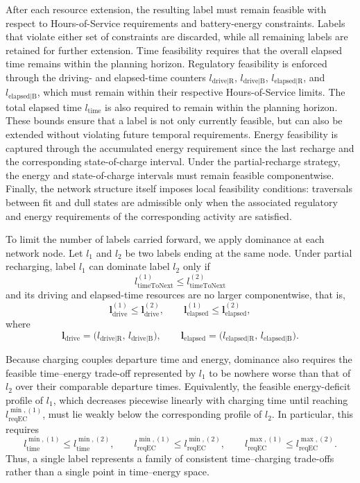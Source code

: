 \documentclass[3p,11pt,authoryear]{elsarticle}  %
\begin{document}

After each resource extension, the resulting label must remain feasible with respect to Hours-of-Service requirements and battery-energy constraints. Labels that violate either set of constraints are discarded, while all remaining labels are retained for further extension. Time feasibility requires that the overall elapsed time remains within the planning horizon. Regulatory feasibility is enforced through the driving- and elapsed-time counters \(l_{\text{drive|R}}\), \(l_{\text{drive|B}}\), \(l_{\text{elapsed|R}}\), and \(l_{\text{elapsed|B}}\), which must remain within their respective Hours-of-Service limits. The total elapsed time \(l_{\text{time}}\) is also required to remain within the planning horizon. These bounds ensure that a label is not only currently feasible, but can also be extended without violating future temporal requirements. Energy feasibility is captured through the accumulated energy requirement since the last recharge and the corresponding state-of-charge interval. Under the partial-recharge strategy, the energy and state-of-charge intervals must remain feasible componentwise. Finally, the network structure itself imposes local feasibility conditions: traversals between fit and dull states are admissible only when the associated regulatory and energy requirements of the corresponding activity are satisfied.

To limit the number of labels carried forward, we apply dominance at each network node. Let \(l_1\) and \(l_2\) be two labels ending at the same node. Under partial recharging, label \(l_1\) can dominate label \(l_2\) only if
\[
l_{\text{timeToNext}}^{(1)} \le l_{\text{timeToNext}}^{(2)}
\]
and its driving and elapsed-time resources are no larger componentwise, that is,
\[
\mathbf{l}_{\text{drive}}^{(1)} \le \mathbf{l}_{\text{drive}}^{(2)}, 
\qquad
\mathbf{l}_{\text{elapsed}}^{(1)} \le \mathbf{l}_{\text{elapsed}}^{(2)},
\]
where
\[
\mathbf{l}_{\text{drive}}
=
\bigl(l_{\text{drive|R}},\,l_{\text{drive|B}}\bigr),
\qquad
\mathbf{l}_{\text{elapsed}}
=
\bigl(l_{\text{elapsed|R}},\,l_{\text{elapsed|B}}\bigr).
\]

Because charging couples departure time and energy, dominance also requires the feasible time--energy trade-off represented by \(l_1\) to be nowhere worse than that of \(l_2\) over their comparable departure times. Equivalently, the feasible energy-deficit profile of \(l_1\), which decreases piecewise linearly with charging time until reaching \(l_{\text{reqEC}}^{\min,(1)}\), must lie weakly below the corresponding profile of \(l_2\). In particular, this requires
\[
l_{\text{time}}^{\min,(1)} \le l_{\text{time}}^{\min,(2)},
\qquad
l_{\text{reqEC}}^{\min,(1)} \le l_{\text{reqEC}}^{\min,(2)},
\qquad
l_{\text{reqEC}}^{\max,(1)} \le l_{\text{reqEC}}^{\max,(2)}.
\]
Thus, a single label represents a family of consistent time--charging trade-offs rather than a single point in time--energy space.
\end{document}
